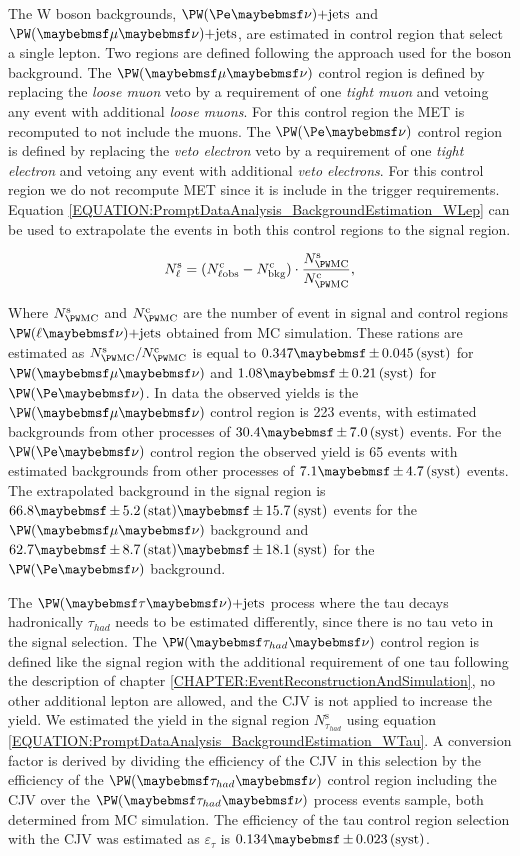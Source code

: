 The W boson backgrounds, $\PW (\Pe \nu)\text{+jets}$ and $\PW (\mu \nu)\text{+jets}$, are estimated in control region that select a single lepton. Two regions are defined following the approach used for the \Z boson background. The $\PW (\mu \nu)$ control region is defined by replacing the \textit{loose muon} veto by a requirement of one \textit{tight muon} and vetoing any event with additional \textit{loose muons}. For this control region the \gls{MET} is recomputed to not include the muons. The $\PW (\Pe \nu)$ control region is defined by replacing the \textit{veto electron} veto by a requirement of one \textit{tight electron} and vetoing any event with additional \textit{veto electrons}. For this control region we do not recompute \gls{MET} since it is include in the trigger requirements. Equation \ref{EQUATION:PromptDataAnalysis_BackgroundEstimation_WLep} can be used to extrapolate the events in both this control regions to the signal region.

\begin{equation}
N^\mathrm{s}_\ell = (N^\mathrm{c}_{\ell\text{obs}} - N^\mathrm{c}_\text{bkg}) \cdot \frac{N^\mathrm{s}_{\PW \mathrm{MC}}}{N^\mathrm{c}_{\PW \mathrm{MC}}},
\label{EQUATION:PromptDataAnalysis_BackgroundEstimation_WLep}
\end{equation}

Where $N^\mathrm{s}_{\PW \mathrm{MC}}$ and $N^\mathrm{c}_{\PW \mathrm{MC}}$  are the number of event in signal and control regions $\PW (\ell \nu)\text{+jets}$ obtained from \gls{MC} simulation. These rations are estimated as $N^\mathrm{s}_{\PW \mathrm{MC}}/N^\mathrm{c}_{\PW \mathrm{MC}}$ is equal to $0.347 \pm 0.045\syst$ for $\PW (\mu \nu)$ and $1.08 \pm 0.21\syst$ for $\PW (\Pe \nu)$. In data the observed yields is the $\PW (\mu \nu)$ control region is 223 events, with estimated backgrounds from other processes of $30.4 \pm 7.0\syst$ events. For the $\PW (\Pe \nu)$ control region the observed yield is 65 events with estimated backgrounds from other processes of $7.1 \pm 4.7\syst$ events. The  extrapolated background in the signal region is $66.8 \pm 5.2\stat \pm 15.7\syst$ events for the $\PW (\mu \nu)$ background and  $62.7 \pm 8.7\stat \pm 18.1\syst$ for the $\PW (\Pe \nu)$ background.

The $\PW (\tau \nu)\text{+jets}$ process where the tau decays hadronically $\tau_{had}$ needs to be estimated differently, since there is no tau veto in the signal selection. The $\PW (\tau_{had} \nu)$ control region is defined like the signal region with the additional requirement of one tau following the description of chapter \ref{CHAPTER:EventReconstructionAndSimulation}, no other additional lepton are allowed, and the \gls{CJV} is not applied to increase the yield. We estimated the yield in the signal region $N^\mathrm{s}_{\tau_{had}}$ using equation \ref{EQUATION:PromptDataAnalysis_BackgroundEstimation_WTau}. A conversion factor is derived by dividing the efficiency of the \gls{CJV} in this selection by the efficiency of the $\PW (\tau_{had} \nu)$ control region including the \gls{CJV} over the $\PW (\tau_{had} \nu)$ process events sample, both determined from \gls{MC} simulation. The efficiency of the tau control region selection with the \gls{CJV} was estimated as $\varepsilon_{\tau}$ is $0.134 \pm 0.023\syst$. 

